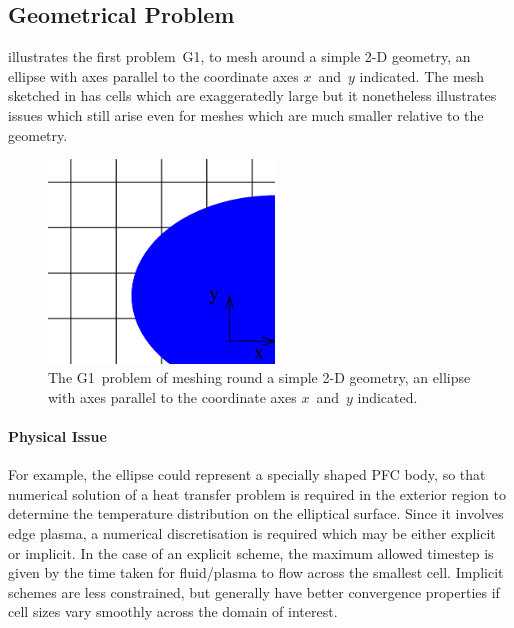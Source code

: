 \subsection{Geometrical Problem}\label{sec:geomprob}
 illustrates the first problem~G1, to mesh around a simple 2-D geometry, an ellipse
with axes parallel to the coordinate axes $x$~and~$y$ indicated.
The mesh sketched in  has cells which are exaggeratedly large
but it nonetheless illustrates issues which still arise even for meshes which are much
smaller relative to the geometry.
\begin{figure}
\centerline{\includegraphics[width=6cm]{../pics/mesh}}
\caption{The G1~problem of meshing round a simple 2-D geometry, an ellipse
with axes parallel to the coordinate axes $x$~and~$y$ indicated.
\label{fig:mesh}}
\end{figure}

\paragraph{Physical Issue}
For example, the ellipse
could represent a specially shaped PFC body, so that numerical solution of a heat
transfer problem is required in the exterior region to determine the temperature
distribution on the elliptical surface. Since it involves edge plasma, a numerical 
discretisation is required which may be either explicit or implicit. In the case
of an explicit scheme, the maximum allowed timestep is given by the time taken for
fluid/plasma to flow across the smallest cell. Implicit schemes are less constrained, but
generally have better convergence properties if cell sizes vary smoothly across
the domain of interest.

